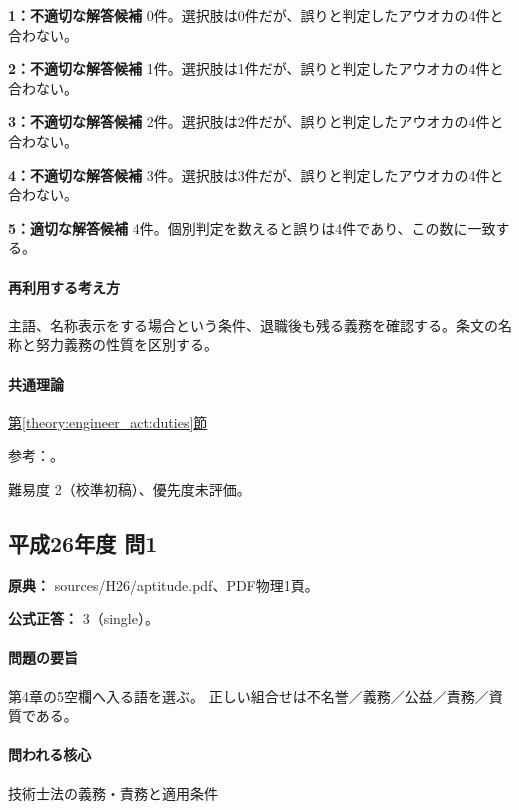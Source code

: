 \noindent\textbf{1：不適切な解答候補} 0件。選択肢は0件だが、誤りと判定したアウオカの4件と合わない。\par

\noindent\textbf{2：不適切な解答候補} 1件。選択肢は1件だが、誤りと判定したアウオカの4件と合わない。\par

\noindent\textbf{3：不適切な解答候補} 2件。選択肢は2件だが、誤りと判定したアウオカの4件と合わない。\par

\noindent\textbf{4：不適切な解答候補} 3件。選択肢は3件だが、誤りと判定したアウオカの4件と合わない。\par

\noindent\textbf{5：適切な解答候補} 4件。個別判定を数えると誤りは4件であり、この数に一致する。\par

\paragraph{再利用する考え方} 主語、名称表示をする場合という条件、退職後も残る義務を確認する。条文の名称と努力義務の性質を区別する。

\paragraph{共通理論} \hyperref[theory:engineer_act:duties]{第\ref*{theory:engineer_act:duties}節}

\par 参考：\cite{engineer_act_current}。

\par 難易度 2（校準初稿）、優先度未評価。

\subsection{平成26年度 問1}
\label{q:h26-reg-apt-01}

\noindent\textbf{原典：} sources/H26/aptitude.pdf、PDF物理1頁。

\textbf{公式正答：} 3（single）。

\paragraph{問題の要旨} 第4章の5空欄へ入る語を選ぶ。 正しい組合せは不名誉／義務／公益／責務／資質である。

\paragraph{問われる核心} 技術士法の義務・責務と適用条件

